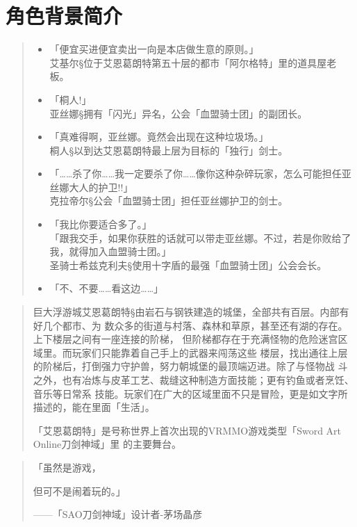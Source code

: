 \documentclass[11pt]{book}
\begin{document}
\chapter{角色背景简介}
\label{sec:org7e8371c}
\begin{quote}
\begin{itemize}
\item 「便宜买进便宜卖出一向是本店做生意的原则。」\\
艾基尔§位于艾恩葛朗特第五十层的都市「阿尔格特」里的道具屋老板。

\item 「桐人!」\\
亚丝娜§拥有「闪光」异名，公会「血盟骑士团」的副团长。

\item 「真难得啊，亚丝娜。竟然会出现在这种垃圾场。」\\
桐人§以到达艾恩葛朗特最上层为目标的「独行」剑士。

\item 「……杀了你……我一定要杀了你……像你这种杂碎玩家，怎么可能担任亚丝娜大人的护卫!!」\\
克拉帝尔§公会「血盟骑士团」担任亚丝娜护卫的剑士。

\item 「我比你要适合多了。」\\
「跟我交手，如果你获胜的话就可以带走亚丝娜。不过，若是你败给了我，就得加入血盟骑士团。」\\
 圣骑士希兹克利夫§使用十字盾的最强「血盟骑士团」公会会长。

\item 「不、不要……看这边……」
\end{itemize}
\end{quote}

\begin{quote}
巨大浮游城艾恩葛朗特§由岩石与钢铁建造的城堡，全部共有百层。内部有好几个都市、为
数众多的街道与村落、森林和草原，甚至还有湖的存在。上下楼层之间有一座连接的阶梯，
但阶梯都存在于充满怪物的危险迷宫区域里。而玩家们只能靠着自己手上的武器来闯荡这些
楼层，找出通往上层的阶梯后，打倒强力守护兽，努力朝城堡的最顶端迈进。除了与怪物战
斗之外，也有冶炼与皮革工艺、裁缝这种制造方面技能；更有钓鱼或者烹饪、音乐等日常系
技能。玩家们在广大的区域里面不只是冒险，更是如文字所描述的，能在里面「生活」。

「艾恩葛朗特」是号称世界上首次出现的VRMMO游戏类型「Sword Art Online刀剑神域」里
的主要舞台。
\end{quote}

\begin{quote}
「虽然是游戏，

但可不是闹着玩的。」

——「SAO刀剑神域」设计者-茅场晶彦
\end{quote}
\end{document}
